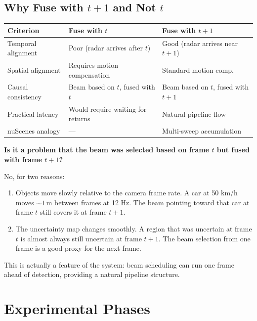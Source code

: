 \documentclass[12pt, a4paper]{article}
\theoremstyle{definition}
\begin{document}
\subsection{Why Fuse with $t+1$ and Not $t$}

\begin{center}
\renewcommand{\arraystretch}{1.3}
\begin{tabular}{lll}
  \toprule
  \textbf{Criterion} & \textbf{Fuse with $t$} & \textbf{Fuse with $t+1$} \\
  \midrule
  Temporal alignment & Poor (radar arrives after $t$) & Good (radar arrives near $t+1$) \\
  Spatial alignment & Requires motion compensation & Standard motion comp.\ \\
  Causal consistency & Beam based on $t$, fused with $t$ & Beam based on $t$, fused with $t+1$ \\
  Practical latency & Would require waiting for returns & Natural pipeline flow \\
  nuScenes analogy & --- & Multi-sweep accumulation \\
  \bottomrule
\end{tabular}
\end{center}

\begin{plainbox}
\textbf{Is it a problem that the beam was selected based on frame $t$ but
fused with frame $t+1$?}

No, for two reasons:
\begin{enumerate}
  \item Objects move slowly relative to the camera frame rate.
        A car at 50 km/h moves $\sim 1$\,m between frames at 12 Hz.
        The beam pointing toward that car at frame $t$ still covers it at frame $t+1$.
  \item The uncertainty map changes smoothly. A region that was uncertain at
        frame $t$ is almost always still uncertain at frame $t+1$.
        The beam selection from one frame is a good proxy for the next frame.
\end{enumerate}
This is actually a feature of the system: beam scheduling can run one frame
ahead of detection, providing a natural pipeline structure.
\end{plainbox}

\section{Experimental Phases}
\label{sec:phases}
\end{document}
